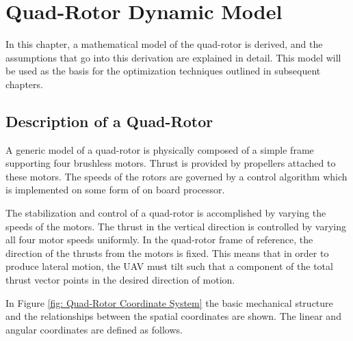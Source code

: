 
\chapter{Quad-Rotor Dynamic Model} %

\label{Chapter3} %



In this chapter, a mathematical model of the quad-rotor is derived, and the assumptions that go into this derivation are explained in detail. This model will be used as the basis for the optimization techniques outlined in subsequent chapters.

\section{Description of a Quad-Rotor}

A generic model of a quad-rotor is physically composed of a simple frame supporting four brushless motors. Thrust is provided by propellers attached to these motors. The speeds of the rotors are governed by a control algorithm which is implemented on some form of on board processor.

 The stabilization and control of a quad-rotor is accomplished by varying the speeds of the motors. The thrust in the vertical direction is controlled by varying all four motor speeds uniformly. In the quad-rotor frame of reference, the direction of the thrusts from the motors is fixed. This means that in order to produce lateral motion, the UAV must tilt such that a component of the total thrust vector points in the desired direction of motion.

 In Figure \ref{fig: Quad-Rotor Coordinate System} the basic mechanical structure and the relationships between the spatial coordinates are shown. The linear and angular coordinates are defined as follows.


